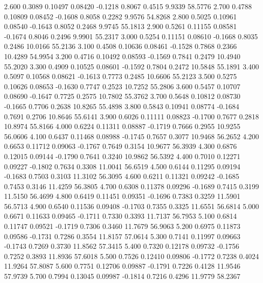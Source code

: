    2.600   0.3089   0.10497   0.08420  -0.1218   0.8067   0.4515   9.9339  58.5776
   2.700   0.4788   0.10809   0.08452  -0.1608   0.8058   0.2282   9.9576  54.8268
   2.800   0.5025   0.10961   0.08540  -0.1643   0.8052   0.2468   9.9745  55.1813
   2.900   0.5261   0.11155   0.08581  -0.1674   0.8046   0.2496   9.9901  55.2317
   3.000   0.5254   0.11151   0.08610  -0.1668   0.8035   0.2486  10.0166  55.2136
   3.100   0.4508   0.10636   0.08461  -0.1528   0.7868   0.2366  10.4289  54.9954
   3.200   0.4716   0.10492   0.08593  -0.1569   0.7841   0.2479  10.4940  55.2020
   3.300   0.4909   0.10525   0.08601  -0.1592   0.7804   0.2472  10.5848  55.1891
   3.400   0.5097   0.10568   0.08621  -0.1613   0.7773   0.2485  10.6606  55.2123
   3.500   0.5275   0.10626   0.08653  -0.1630   0.7747   0.2523  10.7252  55.2806
   3.600   0.5457   0.10707   0.08690  -0.1647   0.7725   0.2575  10.7802  55.3762
   3.700   0.5648   0.10812   0.08730  -0.1665   0.7706   0.2638  10.8265  55.4898
   3.800   0.5843   0.10941   0.08774  -0.1684   0.7691   0.2706  10.8646  55.6141
   3.900   0.6026   0.11111   0.08823  -0.1700   0.7677   0.2818  10.8974  55.8166
   4.000   0.6224   0.11311   0.08887  -0.1719   0.7666   0.2955  10.9255  56.0606
   4.100   0.6437   0.11468   0.08988  -0.1745   0.7657   0.3077  10.9468  56.2652
   4.200   0.6653   0.11712   0.09063  -0.1767   0.7649   0.3154  10.9677  56.3939
   4.300   0.6876   0.12015   0.09144  -0.1790   0.7641   0.3240  10.9862  56.5392
   4.400   0.7010   0.12271   0.09227  -0.1802   0.7634   0.3308  11.0041  56.6519
   4.500   0.6144   0.11295   0.09194  -0.1683   0.7503   0.3103  11.3102  56.3095
   4.600   0.6211   0.11321   0.09242  -0.1685   0.7453   0.3146  11.4259  56.3805
   4.700   0.6308   0.11378   0.09296  -0.1689   0.7415   0.3199  11.5150  56.4699
   4.800   0.6419   0.11451   0.09351  -0.1696   0.7383   0.3259  11.5901  56.5713
   4.900   0.6540   0.11536   0.09408  -0.1703   0.7355   0.3325  11.6551  56.6814
   5.000   0.6671   0.11633   0.09465  -0.1711   0.7330   0.3393  11.7137  56.7953
   5.100   0.6814   0.11747   0.09521  -0.1719   0.7306   0.3460  11.7679  56.9063
   5.200   0.6975   0.11873   0.09586  -0.1731   0.7286   0.3554  11.8157  57.0614
   5.300   0.7141   0.11997   0.09663  -0.1743   0.7269   0.3730  11.8562  57.3415
   5.400   0.7320   0.12178   0.09732  -0.1756   0.7252   0.3893  11.8936  57.6018
   5.500   0.7526   0.12410   0.09806  -0.1772   0.7238   0.4024  11.9264  57.8087
   5.600   0.7751   0.12706   0.09887  -0.1791   0.7226   0.4128  11.9546  57.9739
   5.700   0.7994   0.13045   0.09987  -0.1814   0.7216   0.4296  11.9779  58.2367
